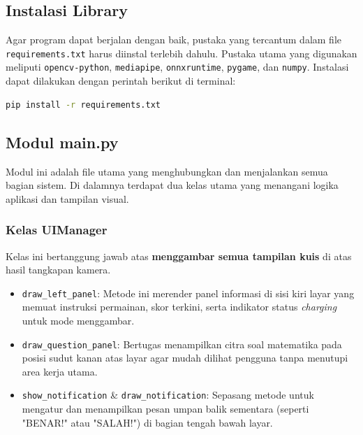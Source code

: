 \subsection{Instalasi Library}
Agar program dapat berjalan dengan baik, pustaka yang tercantum dalam file \texttt{requirements.txt} harus diinstal terlebih dahulu. Pustaka utama yang digunakan meliputi \texttt{opencv-python}, \texttt{mediapipe}, \texttt{onnxruntime}, \texttt{pygame}, dan \texttt{numpy}. Instalasi dapat dilakukan dengan perintah berikut di terminal:

\begin{lstlisting}[language=bash, frame=single, basicstyle=\small\ttfamily]
pip install -r requirements.txt
\end{lstlisting}

\subsection{Modul main.py}
Modul ini adalah file utama yang menghubungkan dan menjalankan semua bagian sistem. Di dalamnya terdapat dua kelas utama yang menangani logika aplikasi dan tampilan visual.

\subsubsection{Kelas UIManager}
Kelas ini bertanggung jawab atas \textbf{menggambar semua tampilan kuis} di atas hasil tangkapan kamera.
\begin{itemize}
    \item \texttt{draw\_left\_panel}: Metode ini merender panel informasi di sisi kiri layar yang memuat instruksi permainan, skor terkini, serta indikator status \textit{charging} untuk mode menggambar.
    \item \texttt{draw\_question\_panel}: Bertugas menampilkan citra soal matematika pada posisi sudut kanan atas layar agar mudah dilihat pengguna tanpa menutupi area kerja utama.
    \item \texttt{show\_notification} \& \texttt{draw\_notification}: Sepasang metode untuk mengatur dan menampilkan pesan umpan balik sementara (seperti "BENAR!" atau "SALAH!") di bagian tengah bawah layar.
\end{itemize}

